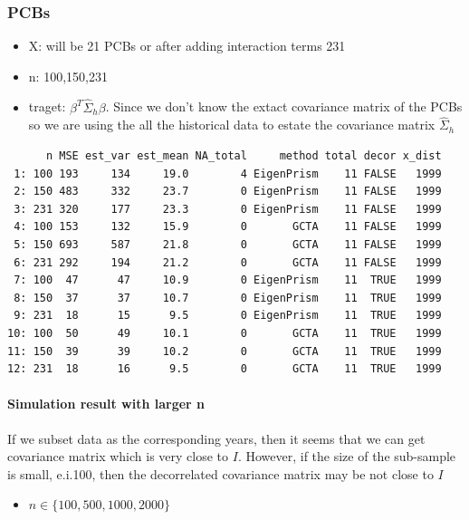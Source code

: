 \documentclass[]{article}
\providecommand{\tightlist}{%
  \setlength{\itemsep}{0pt}\setlength{\parskip}{0pt}}
\let\oldparagraph\paragraph
\renewcommand{\paragraph}[1]{\oldparagraph{#1}\mbox{}}
\begin{document}
\subsubsection{PCBs}\label{pcbs}

\begin{itemize}
\tightlist
\item
  X: will be 21 PCBs or after adding interaction terms 231
\item
  n: 100,150,231
\item
  traget: \(\beta^T\hat{\Sigma}_h\beta\). Since we don't know the extact
  covariance matrix of the PCBs so we are using the all the historical
  data to estate the covariance matrix \(\hat{\Sigma}_h\)
\end{itemize}

\begin{verbatim}
      n MSE est_var est_mean NA_total     method total decor x_dist
 1: 100 193     134     19.0        4 EigenPrism    11 FALSE   1999
 2: 150 483     332     23.7        0 EigenPrism    11 FALSE   1999
 3: 231 320     177     23.3        0 EigenPrism    11 FALSE   1999
 4: 100 153     132     15.9        0       GCTA    11 FALSE   1999
 5: 150 693     587     21.8        0       GCTA    11 FALSE   1999
 6: 231 292     194     21.2        0       GCTA    11 FALSE   1999
 7: 100  47      47     10.9        0 EigenPrism    11  TRUE   1999
 8: 150  37      37     10.7        0 EigenPrism    11  TRUE   1999
 9: 231  18      15      9.5        0 EigenPrism    11  TRUE   1999
10: 100  50      49     10.1        0       GCTA    11  TRUE   1999
11: 150  39      39     10.2        0       GCTA    11  TRUE   1999
12: 231  18      16      9.5        0       GCTA    11  TRUE   1999
\end{verbatim}

\newpage

\paragraph{Simulation result with larger
n}\label{simulation-result-with-larger-n}

If we subset data as the corresponding years, then it seems that we can
get covariance matrix which is very close to \(I\). However, if the size
of the sub-sample is small, e.i.100, then the decorrelated covariance
matrix may be not close to \(I\)

\begin{itemize}
\tightlist
\item
  \(n \in \{100, 500, 1000, 2000\}\)
\end{itemize}
\end{document}
